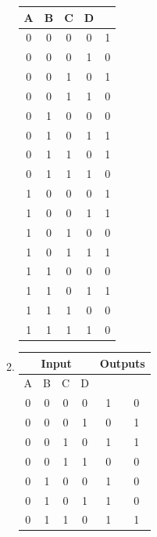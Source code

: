 \begin{enumerate}
\begin{enumerate}
\begin{tabular}{|c|c|c|c|c|}
                    A & B & C & D &  \\ \hline
                    0 & 0 & 0 & 0 & 1 \\ \hline
                    0 & 0 & 0 & 1 & 0 \\ \hline
                    0 & 0 & 1 & 0 & 1 \\ \hline
                    0 & 0 & 1 & 1 & 0 \\ \hline
                    0 & 1 & 0 & 0 & 0 \\ \hline
                    0 & 1 & 0 & 1 & 1 \\ \hline
                    0 & 1 & 1 & 0 & 1 \\ \hline
                    0 & 1 & 1 & 1 & 0 \\ \hline
                    1 & 0 & 0 & 0 & 1 \\ \hline
                    1 & 0 & 0 & 1 & 1 \\ \hline
                    1 & 0 & 1 & 0 & 0 \\ \hline
                    1 & 0 & 1 & 1 & 1 \\ \hline
                    1 & 1 & 0 & 0 & 0 \\ \hline
                    1 & 1 & 0 & 1 & 1 \\ \hline
                    1 & 1 & 1 & 0 & 0 \\ \hline
                    1 & 1 & 1 & 1 & 0 \\ \hline
                \end{tabular}
            \item 
                \begin{tabular}{|c|c|c|c|c|c|}
                    \hline
                    \multicolumn{4}{|c|}{Input} & \multicolumn{2}{|c|}{Outputs}\\ \hline
                    A & B & C & D &   &   \\ \hline
                    0 & 0 & 0 & 0 & 1 & 0 \\ \hline
                    0 & 0 & 0 & 1 & 0 & 1 \\ \hline
                    0 & 0 & 1 & 0 & 1 & 1 \\ \hline
                    0 & 0 & 1 & 1 & 0 & 0 \\ \hline
                    0 & 1 & 0 & 0 & 1 & 0 \\ \hline
                    0 & 1 & 0 & 1 & 1 & 0 \\ \hline
                    0 & 1 & 1 & 0 & 1 & 1 \\ \hline

\end{tabular}
\end{enumerate}
\end{enumerate}

